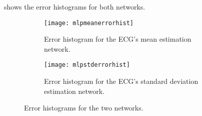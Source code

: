  shows the error histograms for both networks.

\begin{figure}[htbp]
	\centering
	\begin{subfigure}{\textwidth}
		\centering
		\texttt{[image: mlpmeanerrorhist]}
		\caption{Error histogram for the ECG's mean estimation
		network.}\label{fig:mlpmeanerrorhist}
	\end{subfigure}
	\begin{subfigure}{\textwidth}
		\centering
		\texttt{[image: mlpstderrorhist]}
		\caption{Error histogram for the ECG's standard deviation
		estimation network.}\label{fig:mlpstderrorhist}
	\end{subfigure}
	\caption{Error histograms for the two
	networks.}\label{fig:mlperrorhists}
\end{figure}
